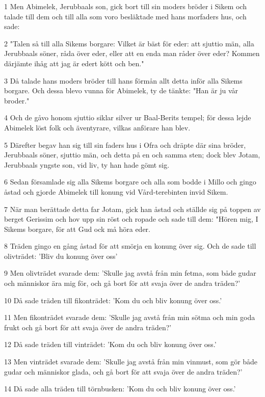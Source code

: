 \par 1 Men Abimelek, Jerubbaals son, gick bort till sin moders bröder i Sikem och talade till dem och till alla som voro besläktade med hans morfaders hus, och sade:
\par 2 "Talen så till alla Sikems borgare: Vilket är bäst för eder: att sjuttio män, alla Jerubbaals söner, råda över eder, eller att en enda man råder över eder? Kommen därjämte ihåg att jag är edert kött och ben."
\par 3 Då talade hans moders bröder till hans förmån allt detta inför alla Sikems borgare. Och dessa blevo vunna för Abimelek, ty de tänkte: "Han är ju vår broder."
\par 4 Och de gåvo honom sjuttio siklar silver ur Baal-Berits tempel; för dessa lejde Abimelek löst folk och äventyrare, vilkas anförare han blev.
\par 5 Därefter begav han sig till sin faders hus i Ofra och dräpte där sina bröder, Jerubbaals söner, sjuttio män, och detta på en och samma sten; dock blev Jotam, Jerubbaals yngste son, vid liv, ty han hade gömt sig.
\par 6 Sedan församlade sig alla Sikems borgare och alla som bodde i Millo och gingo åstad och gjorde Abimelek till konung vid Vård-terebinten invid Sikem.
\par 7 När man berättade detta far Jotam, gick han åstad och ställde sig på toppen av berget Gerissim och hov upp sin röst och ropade och sade till dem: "Hören mig, I Sikems borgare, för att Gud ock må höra eder.
\par 8 Träden gingo en gång åstad för att smörja en konung över sig. Och de sade till olivträdet: 'Bliv du konung över oss'
\par 9 Men olivträdet svarade dem: 'Skulle jag avstå från min fetma, som både gudar och människor ära mig för, och gå bort för att svaja över de andra träden?'
\par 10 Då sade träden till fikonträdet: 'Kom du och bliv konung över oss.'
\par 11 Men fikonträdet svarade dem: 'Skulle jag avstå från min sötma och min goda frukt och gå bort för att svaja över de andra träden?'
\par 12 Då sade träden till vinträdet: 'Kom du och bliv konung över oss.'
\par 13 Men vinträdet svarade dem: 'Skulle jag avstå från min vinmust, som gör både gudar och människor glada, och gå bort för att svaja över de andra träden?'
\par 14 Då sade alla träden till törnbusken: 'Kom du och bliv konung över oss.'
